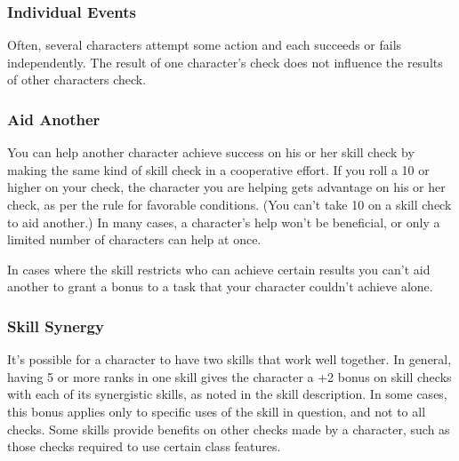 \subsubsection{Individual Events}
Often, several characters attempt some action and each succeeds or fails independently. The result of one character's  check does not influence the results of other characters  check.

\subsubsection{Aid Another}
You can help another character achieve success on his or her skill check by making the same kind of skill check in a cooperative effort. If you roll a 10 or higher on your check, the character you are helping gets advantage on his or her check, as per the rule for favorable conditions. (You can't take 10 on a skill check to aid another.) In many cases, a character's help won't be beneficial, or only a limited number of characters can help at once.

In cases where the skill restricts who can achieve certain results you can't aid another to grant a bonus to a task that your character couldn't achieve alone.

\subsubsection{Skill Synergy}
It's possible for a character to have two skills that work well together. In general, having 5 or more ranks in one skill gives the character a +2 bonus on skill checks with each of its synergistic skills, as noted in the skill description. In some cases, this bonus applies only to specific uses of the skill in question, and not to all checks. Some skills provide benefits on other checks made by a character, such as those checks required to use certain class features.

